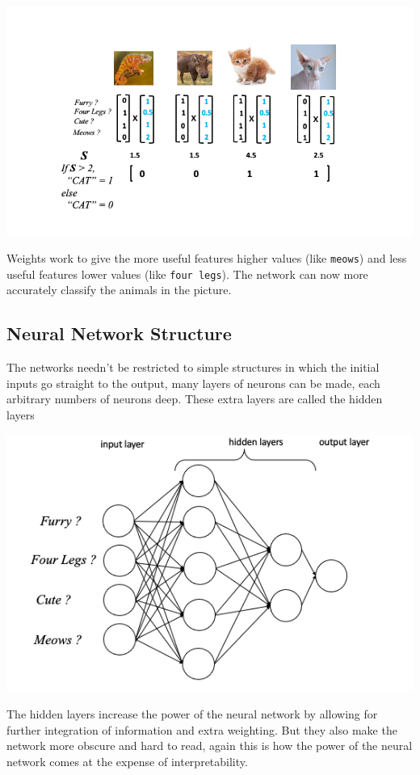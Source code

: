 \documentclass[
]{book}
\begin{document}
\includegraphics{figs/percepwts/Slide4.png}

Weights work to give the more useful features higher values (like \texttt{meows}) and less useful features lower values (like \texttt{four\ legs}). The network can now more accurately classify the animals in the picture.

\hypertarget{neural-network-structure}{%
\subsection{Neural Network Structure}\label{neural-network-structure}}

The networks needn't be restricted to simple structures in which the initial inputs go straight to the output, many layers of neurons can be made, each arbitrary numbers of neurons deep. These extra layers are called the hidden layers

\includegraphics{figs/layers.png}

The hidden layers increase the power of the neural network by allowing for further integration of information and extra weighting. But they also make the network more obscure and hard to read, again this is how the power of the neural network comes at the expense of interpretability.
\end{document}
